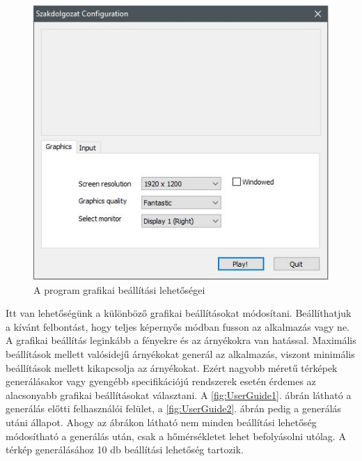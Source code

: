 \begin{figure}[h!]
\centering
\includegraphics[scale=0.5]{kepek/UnityStartUp.jpg}
\caption{A program grafikai beállítási lehetőségei}
\label{fig:UnityStartUp}
\end{figure}

\noindent Itt van lehetőségünk a különböző grafikai beállításokat módosítani. Beállíthatjuk a kívánt felbontást, hogy teljes képernyős módban fusson az alkalmazás vagy ne. A grafikai beállítás leginkább a fényekre és az árnyékokra van hatással. Maximális beállítások mellett valósidejű árnyékokat generál az alkalmazás, viszont minimális beállítások mellett kikapcsolja az árnyékokat. Ezért nagyobb méretű térképek generálásakor vagy gyengébb specifikációjú rendszerek esetén érdemes az alacsonyabb grafikai beállításokat választani.
\newline
\newline A \ref{fig:UserGuide1}. ábrán látható a generálás előtti felhasználói felület, a \ref{fig:UserGuide2}. ábrán pedig a generálás utáni állapot. Ahogy az ábrákon látható nem minden beállítási lehetőség módosítható a generálás után, csak a hőmérsékletet lehet befolyásolni utólag. A térkép generálásához 10 db beállítási lehetőség tartozik.

